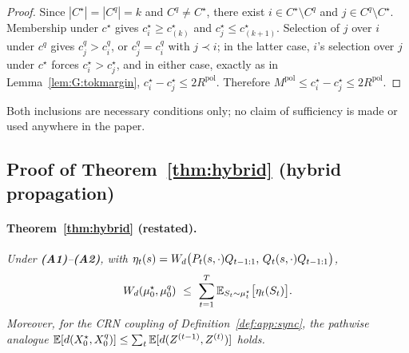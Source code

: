 \begin{proof}
Since $|C^{\star}|=|C^{q}|=k$ and $C^{q}\neq C^{\star}$, there exist
$i\in C^{\star}\setminus C^{q}$ and $j\in C^{q}\setminus C^{\star}$. Membership under $c^{\star}$
gives $c^{\star}_{i}\ge c^{\star}_{(k)}$ and $c^{\star}_{j}\le c^{\star}_{(k+1)}$. Selection of
$j$ over $i$ under $c^{q}$ gives $c^{q}_{j}>c^{q}_{i}$, or $c^{q}_{j}=c^{q}_{i}$ with
$j\prec i$; in the latter case, $i$'s selection over $j$ under $c^{\star}$ forces
$c^{\star}_{i}>c^{\star}_{j}$, and in either case, exactly as in
Lemma~\ref{lem:G:tokmargin},
$c^{\star}_{i}-c^{\star}_{j}\le2R^{\mathrm{pol}}$. Therefore
$M^{\mathrm{pol}}\le c^{\star}_{i}-c^{\star}_{j}\le2R^{\mathrm{pol}}$.
\end{proof}

Both inclusions are necessary conditions only; no claim of sufficiency is made or used anywhere in
the paper.

\subsection{Proof of Theorem~\ref{thm:hybrid} (hybrid propagation)}
\label{app:proofs:hybrid}

\paragraph{Theorem~\ref{thm:hybrid} (restated).}
\emph{Under \textbf{(A1)}--\textbf{(A2)}, with
$\eta_{t}(s)=W_{d}\big(P_{t}(s,\cdot)Q_{t-1:1},\,Q_{t}(s,\cdot)Q_{t-1:1}\big)$,}
\[
\Wd(\mu^{\star}_{0},\mu^{q}_{0})\ \le\ \sum_{t=1}^{T}\Ex_{S_{t}\sim\mu^{\star}_{t}}\big[\eta_{t}(S_{t})\big].
\]
\emph{Moreover, for the CRN coupling of Definition~\ref{def:app:sync}, the pathwise analogue
$\mathbb{E}[d(X^{\star}_{0},X^{q}_{0})]\le\sum_{t}\mathbb{E}[d(Z^{(t-1)},Z^{(t)})]$ holds.}

